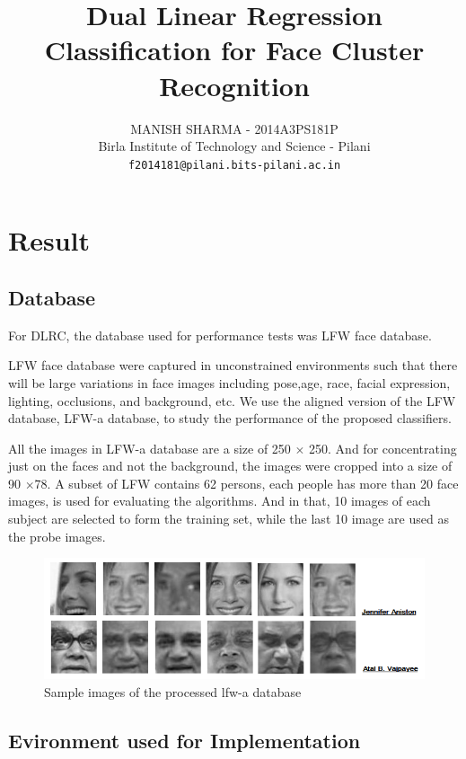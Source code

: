 \documentclass[a4paper]{article}
\title{\textbf{Dual Linear Regression Classification for Face Cluster Recognition}}
\date{}
\author{MANISH SHARMA - 2014A3PS181P\\Birla Institute of Technology and Science - Pilani \\ \texttt{f2014181@pilani.bits-pilani.ac.in}}
\begin{document}
	\maketitle
	
			
	\section{Result}
	
		\subsection{Database}
		For  DLRC, the database used for performance tests was LFW face database.
		
		LFW face database were captured in unconstrained environments
		such that there will be large variations in face images
		including pose,age, race, facial expression, lighting,
		occlusions, and background, etc. We use the aligned version
		of the LFW database, LFW-a database, to study the
		performance of the proposed classifiers. 
		
		All the
		images in LFW-a database are a size of 250 ${\times}$ 250. And for concentrating just on the faces and not the background, the images were cropped into
		a size of 90 ${\times}$78. A subset of LFW contains 62 persons,
		each people has more than 20 face images, is used for
		evaluating the algorithms. And in that, 10 images of each subject
		are selected to form the training set, while the last 10 image
		are used as the probe images.
		
		\begin{figure}[h!]
			
			\includegraphics[scale=0.75]{sample_dataset.png}
			\caption{ Sample images of the processed lfw-a database }
			
			
		\end{figure}
		
		\subsection{Evironment used for Implementation}
		
\end{document}
